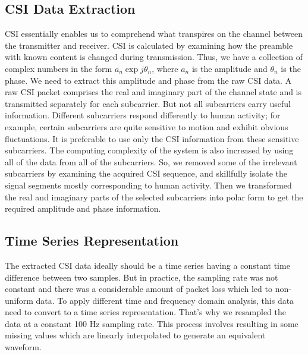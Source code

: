 \subsection{CSI Data Extraction}
CSI essentially enables us to comprehend what transpires on the channel between the transmitter and receiver. CSI is calculated by examining how the preamble with known content is changed during transmission. Thus, we have a collection of complex numbers in the form $a_{n} \exp j \theta_{n}$, where $a_{n}$ is the amplitude and $ \theta_{n}$ is the phase. We need to extract this amplitude and phase from the raw CSI data. A raw CSI packet comprises the real and imaginary part of the channel state and is transmitted separately for each subcarrier. But not all subcarriers carry useful information. Different subcarriers respond differently to human activity; for example, certain subcarriers are quite sensitive to motion and exhibit obvious fluctuations. It is preferable to use only the CSI information from these sensitive subcarriers. The computing complexity of the system is also increased by using all of the data from all of the subcarriers. So, we removed some of the irrelevant subcarriers by examining the acquired CSI sequence, and skillfully isolate the signal segments mostly corresponding to human activity. Then we transformed the real and imaginary parts of the selected subcarriers into polar form to get the required amplitude and phase information.

\subsection{Time Series Representation}
The extracted CSI data ideally should be a time series having a constant time difference between two samples. But in practice, the sampling rate was not constant and there was a considerable amount of packet loss which led to non-uniform data. To apply different time and frequency domain analysis, this data need to convert to a time series representation. That's why we resampled the data at a constant 100 Hz sampling rate. This process involves resulting in some missing values which are linearly interpolated to generate an equivalent waveform.

